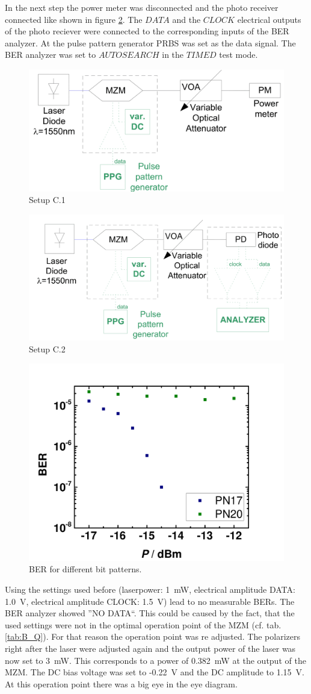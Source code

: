 In the next step the power meter was disconnected and the photo receiver connected like shown in figure \ref{fig:C_setup2}\footnotemark[3]. The $DATA$ and the $CLOCK$ electrical outputs of the photo reciever were connected to the corresponding inputs of the BER analyzer. At the pulse pattern generator PRBS was set as the data signal. The BER analyzer was set to $AUTOSEARCH$ in the $TIMED$ test mode. 
\begin{figure}%
\centering
\includegraphics[width=.6\columnwidth]{Grafiken/C_setup1.png}%
\caption{Setup C.1}%
\label{fig:C_setup1}%
\end{figure}


\begin{figure}%
\centering
\includegraphics[width=.6\columnwidth]{Grafiken/C_setup2.png}%
\caption{Setup C.2}%
\label{fig:C_setup2}%
\end{figure}



\begin{figure}%
\centering
\includegraphics[width=.6\columnwidth]{Grafiken/BER.pdf}%
\caption{BER for different bit patterns.}%
\label{fig:BER}%
\end{figure}
Using the settings used before (laserpower: 1~mW, electrical amplitude DATA: 1.0~V, electrical amplitude CLOCK: 1.5~V) lead to no measurable BERs. The BER analyzer showed ''NO DATA``. This could be caused by the fact, that the used settings were not in the optimal operation point of the MZM (cf. tab. \ref{tab:B_Q}). For that reason the operation point was re adjusted. The polarizers right after the laser were adjusted again and the output power of the laser was now set to 3~mW. This corresponds to a power of 0.382~mW at the output of the MZM. The DC bias voltage was set to -0.22~V and the DC amplitude to 1.15~V. At this operation point there was a big eye in the eye diagram.

